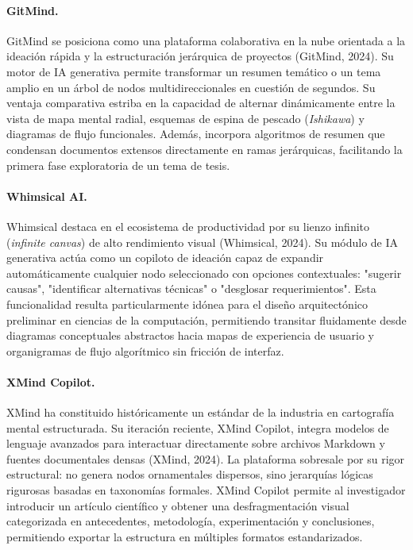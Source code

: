 \paragraph{GitMind.}
GitMind se posiciona como una plataforma colaborativa en la nube orientada a la ideación rápida y la estructuración jerárquica de proyectos (GitMind, 2024). Su motor de IA generativa permite transformar un resumen temático o un tema amplio en un árbol de nodos multidireccionales en cuestión de segundos. Su ventaja comparativa estriba en la capacidad de alternar dinámicamente entre la vista de mapa mental radial, esquemas de espina de pescado (\textit{Ishikawa}) y diagramas de flujo funcionales. Además, incorpora algoritmos de resumen que condensan documentos extensos directamente en ramas jerárquicas, facilitando la primera fase exploratoria de un tema de tesis.

\paragraph{Whimsical AI.}
Whimsical destaca en el ecosistema de productividad por su lienzo infinito (\textit{infinite canvas}) de alto rendimiento visual (Whimsical, 2024). Su módulo de IA generativa actúa como un copiloto de ideación capaz de expandir automáticamente cualquier nodo seleccionado con opciones contextuales: "sugerir causas", "identificar alternativas técnicas" o "desglosar requerimientos". Esta funcionalidad resulta particularmente idónea para el diseño arquitectónico preliminar en ciencias de la computación, permitiendo transitar fluidamente desde diagramas conceptuales abstractos hacia mapas de experiencia de usuario y organigramas de flujo algorítmico sin fricción de interfaz.

\paragraph{XMind Copilot.}
XMind ha constituido históricamente un estándar de la industria en cartografía mental estructurada. Su iteración reciente, XMind Copilot, integra modelos de lenguaje avanzados para interactuar directamente sobre archivos Markdown y fuentes documentales densas (XMind, 2024). La plataforma sobresale por su rigor estructural: no genera nodos ornamentales dispersos, sino jerarquías lógicas rigurosas basadas en taxonomías formales. XMind Copilot permite al investigador introducir un artículo científico y obtener una desfragmentación visual categorizada en antecedentes, metodología, experimentación y conclusiones, permitiendo exportar la estructura en múltiples formatos estandarizados.

